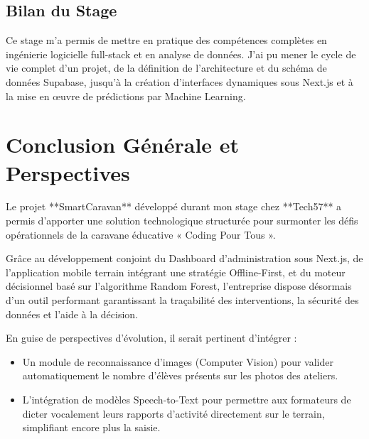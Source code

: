 \documentclass[12pt,a4paper]{report}
\begin{document}
\section{Bilan du Stage}
Ce stage m'a permis de mettre en pratique des compétences complètes en ingénierie logicielle full-stack et en analyse de données. J'ai pu mener le cycle de vie complet d'un projet, de la définition de l'architecture et du schéma de données Supabase, jusqu'à la création d'interfaces dynamiques sous Next.js et à la mise en œuvre de prédictions par Machine Learning.

\chapter*{Conclusion Générale et Perspectives}

Le projet **SmartCaravan** développé durant mon stage chez **Tech57** a permis d'apporter une solution technologique structurée pour surmonter les défis opérationnels de la caravane éducative « Coding Pour Tous ».

Grâce au développement conjoint du Dashboard d'administration sous Next.js, de l'application mobile terrain intégrant une stratégie Offline-First, et du moteur décisionnel basé sur l'algorithme Random Forest, l'entreprise dispose désormais d'un outil performant garantissant la traçabilité des interventions, la sécurité des données et l'aide à la décision.

En guise de perspectives d'évolution, il serait pertinent d'intégrer :
\begin{itemize}
    \item Un module de reconnaissance d'images (Computer Vision) pour valider automatiquement le nombre d'élèves présents sur les photos des ateliers.
    \item L'intégration de modèles Speech-to-Text pour permettre aux formateurs de dicter vocalement leurs rapports d'activité directement sur le terrain, simplifiant encore plus la saisie.
\end{itemize}

\newpage
\end{document}

